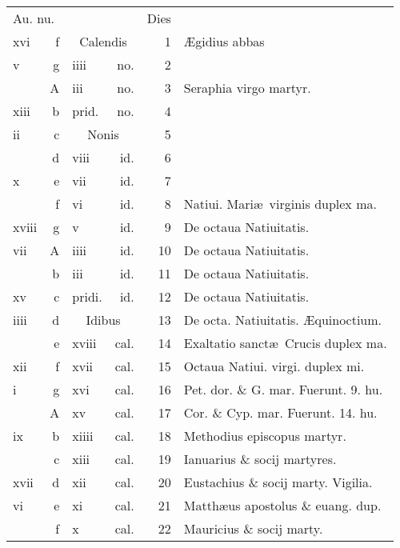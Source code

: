 \documentclass[a5paper,10pt]{book}
\begin{document}
\begin{center}
\begin{tabular}{l r l r r l}
\multicolumn{2}{l}{\color{red}Au. nu.} & & & \color{red} Dies & \\
xvi & f & \multicolumn{2}{c}{\color{red} Calendis} & 1 & \AE gidius abbas \\
v & g & iiii & no. & 2 & \\
 & \color{red} A & iii & no. & 3 & Seraphia virgo martyr. \\
xiii & b & \color{red} prid. & no. & 4 & \\
ii & c & \multicolumn{2}{c}{\color{red} Nonis} & 5 & \\
 & d & viii & id. & 6 & \\
x & e & vii & id. & 7 & \\
 & f & vi & id. & 8 & \color{red} Natiui. Mari\ae \ virginis duplex ma. \color{black} \\
xviii & g & v & id. & 9 & De octaua Natiuitatis. \\
vii & \color{red} A & iiii & id. & 10 & De octaua Natiuitatis. \\
 & b & iii & id. & 11 & De octaua Natiuitatis. \\
xv & c & \color{red} pridi. & id. & 12 & De octaua Natiuitatis. \\
iiii & d & \multicolumn{2}{c}{\color{red} Idibus} & 13 & De octa. Natiuitatis. \color{red} \AE quinoctium. \color{black} \\
 & e & xviii & cal. & 14 & \color{red} Exaltatio sanct\ae \ Crucis duplex ma. \color{black} \\%
xii & f & xvii & cal. & 15 & \color{red} Octaua Natiui. virgi. duplex mi. \color{black} \\
i & g & xvi & cal. & 16 & Pet. dor. \& G. mar. \color{red} Fuerunt. 9. hu.\color{black} \\
 & \color{red} A & xv & cal. & 17 & Cor. \& Cyp. mar. \color{red} Fuerunt. 14. hu. \color{black} \\
ix & b & xiiii & cal. & 18 & Methodius episcopus martyr. \\
 & c & xiii & cal. & 19 & Ianuarius \& socij martyres. \\
xvii & d & xii & cal. & 20 & Eustachius \& socij marty. \color{red} Vigilia. \\
vi & e & xi & cal. & 21 & \color{red} Matth\ae us apostolus \& euang. dup. \color{black} \\
 & f & x & cal. & 22 & Mauricius \& socij marty. \\

\end{tabular}
\end{center}
\end{document}
